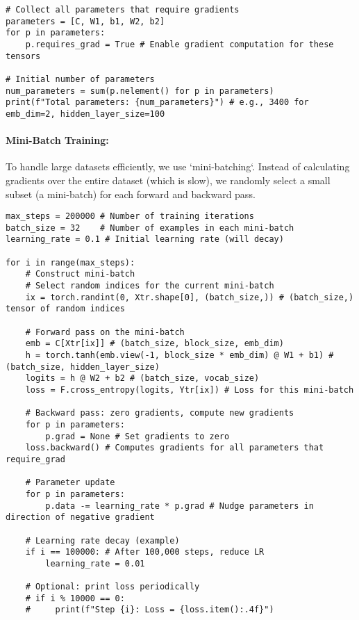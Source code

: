 \begin{lstlisting}[caption=Parameter Collection and Initialization]
# Collect all parameters that require gradients
parameters = [C, W1, b1, W2, b2]
for p in parameters:
    p.requires_grad = True # Enable gradient computation for these tensors

# Initial number of parameters
num_parameters = sum(p.nelement() for p in parameters)
print(f"Total parameters: {num_parameters}") # e.g., 3400 for emb_dim=2, hidden_layer_size=100
\end{lstlisting}

\paragraph{Mini-Batch Training:}
To handle large datasets efficiently, we use `mini-batching`. Instead of calculating gradients over the entire dataset (which is slow), we randomly select a small subset (a mini-batch) for each forward and backward pass.

\begin{lstlisting}[caption=Training Loop with Mini-Batching]
max_steps = 200000 # Number of training iterations
batch_size = 32    # Number of examples in each mini-batch
learning_rate = 0.1 # Initial learning rate (will decay)

for i in range(max_steps):
    # Construct mini-batch
    # Select random indices for the current mini-batch
    ix = torch.randint(0, Xtr.shape[0], (batch_size,)) # (batch_size,) tensor of random indices

    # Forward pass on the mini-batch
    emb = C[Xtr[ix]] # (batch_size, block_size, emb_dim)
    h = torch.tanh(emb.view(-1, block_size * emb_dim) @ W1 + b1) # (batch_size, hidden_layer_size)
    logits = h @ W2 + b2 # (batch_size, vocab_size)
    loss = F.cross_entropy(logits, Ytr[ix]) # Loss for this mini-batch

    # Backward pass: zero gradients, compute new gradients
    for p in parameters:
        p.grad = None # Set gradients to zero
    loss.backward() # Computes gradients for all parameters that require_grad

    # Parameter update
    for p in parameters:
        p.data -= learning_rate * p.grad # Nudge parameters in direction of negative gradient

    # Learning rate decay (example)
    if i == 100000: # After 100,000 steps, reduce LR
        learning_rate = 0.01

    # Optional: print loss periodically
    # if i % 10000 == 0:
    #     print(f"Step {i}: Loss = {loss.item():.4f}")
\end{lstlisting}


